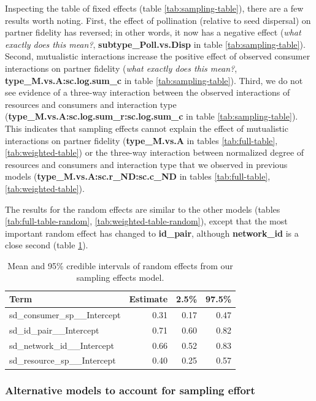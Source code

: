 \documentclass[11pt,]{article}
\begin{document}
Inspecting the table of fixed effects (table \ref{tab:sampling-table}),
there are a few results worth noting. First, the effect of pollination
(relative to seed dispersal) on partner fidelity has reversed; in other
words, it now has a negative effect (\emph{what exactly does this
mean?}, \textbf{subtype\_Poll.vs.Disp} in table
\ref{tab:sampling-table}). Second, mutualistic interactions increase the
positive effect of observed consumer interactions on partner fidelity
(\emph{what exactly does this mean?},
\textbf{type\_M.vs.A:sc.log.sum\_c} in table \ref{tab:sampling-table}).
Third, we do not see evidence of a three-way interaction between the
observed interactions of resources and consumers and interaction type
(\textbf{type\_M.vs.A:sc.log.sum\_r:sc.log.sum\_c} in table
\ref{tab:sampling-table}). This indicates that sampling effects cannot
explain the effect of mutualistic interactions on partner fidelity
(\textbf{type\_M.vs.A} in tables \ref{tab:full-table},
\ref{tab:weighted-table}) or the three-way interaction between
normalized degree of resources and consumers and interaction type that
we observed in previous models (\textbf{type\_M.vs.A:sc.r\_ND:sc.c\_ND}
in tables \ref{tab:full-table}, \ref{tab:weighted-table}).

The results for the random effects are similar to the other models
(tables \ref{tab:full-table-random}, \ref{tab:weighted-table-random}),
except that the most important random effect has changed to
\textbf{id\_pair}, although \textbf{network\_id} is a close second
(table \ref{tab:sampling-table-random}).

\begin{table}[!h]

\caption{\label{tab:sampling-table-random}Mean and 95\% credible intervals of random effects from our sampling effects model.}
\centering
\begin{tabular}{lrrr}
\toprule
Term & Estimate & 2.5\% & 97.5\%\\
\midrule
\rowcolor{gray!6}  sd\_consumer\_sp\_\_Intercept & 0.31 & 0.17 & 0.47\\
sd\_id\_pair\_\_Intercept & 0.71 & 0.60 & 0.82\\
\rowcolor{gray!6}  sd\_network\_id\_\_Intercept & 0.66 & 0.52 & 0.83\\
sd\_resource\_sp\_\_Intercept & 0.40 & 0.25 & 0.57\\
\bottomrule
\end{tabular}
\end{table}

\subsubsection{Alternative models to account for sampling
effort}\label{alternative-models-to-account-for-sampling-effort}
\end{document}
